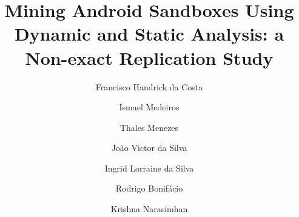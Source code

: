 \documentclass[review]{elsarticle}
\begin{document}
\begin{frontmatter}
\title{Mining Android Sandboxes Using Dynamic and Static Analysis: a Non-exact Replication Study}


\author[1]{Francisco Handrick da Costa}
\author[1]{Ismael Medeiros}
\author[1]{Thales Menezes}
\author[1]{Jo\~{a}o Victor da Silva}
\author[1]{Ingrid Lorraine da Silva}
\author[1]{Rodrigo Bonif\'{a}cio}
\author[2]{Krishna Narasimhan}

\address[1]{Computer Science Department, University of Bras\'{i}lia, Brazil}
\address[2]{Software Technology Group, TU Darmstadt, Germany}




\end{frontmatter}




%


%





% 
\end{document}
